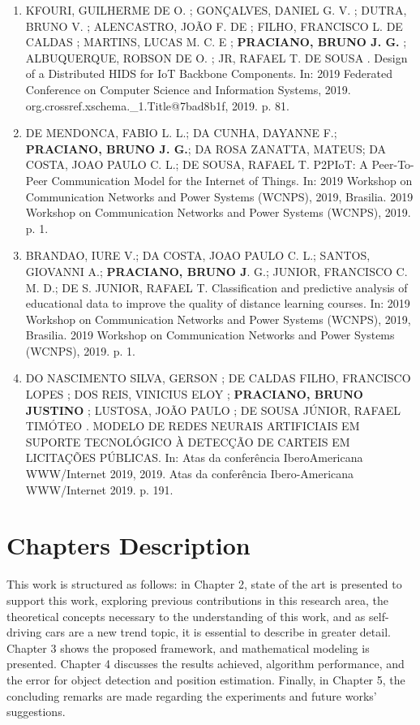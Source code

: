 \begin{enumerate}
\item KFOURI, GUILHERME DE O. ; GONÇALVES, DANIEL G. V. ; DUTRA, BRUNO V. ; ALENCASTRO, JOÃO F. DE ; FILHO, FRANCISCO L. DE CALDAS ; MARTINS, LUCAS M. C. E ; \textbf{PRACIANO, BRUNO J. G.} ; ALBUQUERQUE, ROBSON DE O. ; JR, RAFAEL T. DE SOUSA . Design of a Distributed HIDS for IoT Backbone Components. In: 2019 Federated Conference on Computer Science and Information Systems, 2019. org.crossref.xschema.\_1.Title@7bad8b1f, 2019. p. 81.

\item DE MENDONCA, FABIO L. L.; DA CUNHA, DAYANNE F.; \textbf{PRACIANO, BRUNO J. G.}; DA ROSA ZANATTA, MATEUS; DA COSTA, JOAO PAULO C. L.; DE SOUSA, RAFAEL T. P2PIoT: A Peer-To-Peer Communication Model for the Internet of Things. In: 2019 Workshop on Communication Networks and Power Systems (WCNPS), 2019, Brasilia. 2019 Workshop on Communication Networks and Power Systems (WCNPS), 2019. p. 1.

\item BRANDAO, IURE V.; DA COSTA, JOAO PAULO C. L.; SANTOS, GIOVANNI A.; \textbf{PRACIANO, BRUNO J}. G.; JUNIOR, FRANCISCO C. M. D.; DE S. JUNIOR, RAFAEL T. Classification and predictive analysis of educational data to improve the quality of distance learning courses. In: 2019 Workshop on Communication Networks and Power Systems (WCNPS), 2019, Brasilia. 2019 Workshop on Communication Networks and Power Systems (WCNPS), 2019. p. 1.


\item DO NASCIMENTO SILVA, GERSON ; DE CALDAS FILHO, FRANCISCO LOPES ; DOS REIS, VINICIUS ELOY ; \textbf{PRACIANO, BRUNO JUSTINO }; LUSTOSA, JOÃO PAULO ; DE SOUSA JÚNIOR, RAFAEL TIMÓTEO . MODELO DE REDES NEURAIS ARTIFICIAIS EM SUPORTE TECNOLÓGICO À DETECÇÃO DE CARTEIS EM LICITAÇÕES PÚBLICAS. In: Atas da conferência IberoAmericana WWW/Internet 2019, 2019. Atas da conferência Ibero-Americana WWW/Internet 2019. p. 191.

\end{enumerate}

\section{Chapters Description}

This work is structured as follows: in Chapter 2, state of the art is presented to support this work, exploring previous contributions in this research area, the theoretical concepts necessary to the understanding of this work, and as self-driving cars are a new trend topic, it is essential to describe in greater detail.  Chapter 3 shows the proposed framework, and mathematical modeling is presented. Chapter 4 discusses the results achieved, algorithm performance, and the error for object detection and position estimation. Finally, in Chapter 5, the concluding remarks are made regarding the experiments and future works' suggestions.


